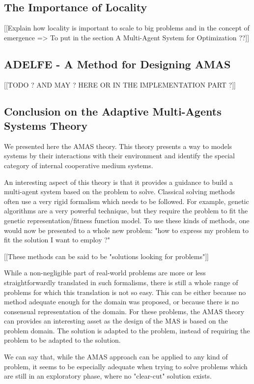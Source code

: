 \subsection{The Importance of Locality}
[[Explain how locality is important to scale to big problems and in the concept of emergence => To put in the section A Multi-Agent System for Optimization ??]]

\subsection{ADELFE - A Method for Designing AMAS} 
[[TODO ? AND MAY ? HERE OR IN THE IMPLEMENTATION PART ?]]

\subsection{Conclusion on the Adaptive Multi-Agents Systems Theory}

We presented here the AMAS theory. This theory presents a way to models systems by their interactions with their environment and identify the special category of internal cooperative medium systems.

An interesting aspect of this theory  is that it provides a guidance to build a multi-agent system based on the problem to solve. Classical solving methods often use a very rigid formalism which needs to be followed. For example, genetic algorithms are a very powerful technique, but they require the problem to fit the genetic representation/fitness function model. To use these kinds of methods, one would now be presented to a whole new problem: "how to express my problem to fit the solution I want to employ ?"

[[These methods can be said to be "solutions looking for problems"]]

While a non-negligible part of real-world problems are more or less straightforwardly translated in such formalisms, there is still a whole range of problems for which this translation is not so easy. This can be either because no method adequate enough for the domain was proposed, or because there is no consensual representation of the domain. For these problems, the AMAS theory can provides an interesting asset as the design of the MAS is based on the problem domain. The solution is adapted to the problem, instead of requiring the problem to be adapted to the solution.

We can say that, while the AMAS approach can be applied to any kind of problem, it seems to be especially adequate when trying to solve problems which are still in an exploratory phase, where no "clear-cut" solution exists.


